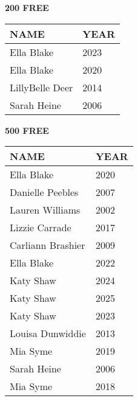 \vspace{0.4cm}

\begin{minipage}[t]{0.48\textwidth}
\centering
\textbf{200 FREE}\\[0.05cm]
\begin{tabular}{@{}p{2.8cm}p{1.2cm}@{}}
\hline
\textbf{NAME} & \textbf{YEAR} \\
\hline
Ella Blake & 2023 \\
Ella Blake & 2020 \\
LillyBelle Deer & 2014 \\
Sarah Heine & 2006 \\
\hline
\end{tabular}
\end{minipage}\hfill
\begin{minipage}[t]{0.48\textwidth}
\centering
\textbf{500 FREE}\\[0.05cm]
\begin{tabular}{@{}p{2.8cm}p{1.2cm}@{}}
\hline
\textbf{NAME} & \textbf{YEAR} \\
\hline
Ella Blake & 2020 \\
Danielle Peebles & 2007 \\
Lauren Williams & 2002 \\
Lizzie Carrade & 2017 \\
Carliann Brashier & 2009 \\
Ella Blake & 2022 \\
Katy Shaw & 2024 \\
Katy Shaw & 2025 \\
Katy Shaw & 2023 \\
Louisa Dunwiddie & 2013 \\
Mia Syme & 2019 \\
Sarah Heine & 2006 \\
Mia Syme & 2018 \\
\hline
\end{tabular}
\end{minipage}

\vspace{0.4cm}

